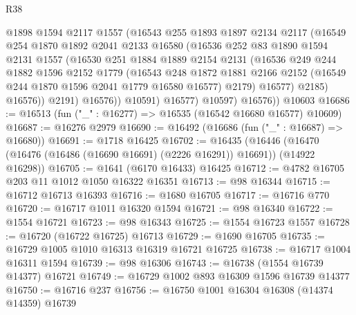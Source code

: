 \begin{lexlean}{R38}
\begin{coremodule}
                  @1898
                  @1594
                  @2117
                  @1557
                  (@16543
                    @255
                    @1893
                    @1897
                    @2134
                    @2117
                    (@16549
                      @254
                      @1870
                      @1892
                      @2041
                      @2133
                      @16580
                      (@16536
                        @252
                        @83
                        @1890
                        @1594
                        @2131
                        @1557
                        (@16530
                          @251
                          @1884
                          @1889
                          @2154
                          @2131
                          (@16536
                            @249
                            @244
                            @1882
                            @1596
                            @2152
                            @1779
                            (@16543
                              @248
                              @1872
                              @1881
                              @2166
                              @2152
                              (@16549 @244 @1870 @1596 @2041 @1779 @16580 @16577)
                              @2179)
                            @16577)
                          @2185)
                        @16576))
                    @2191)
                  @16576))
              @10591)
            @16577)
          @10597)
        @16576))
    @10603
@16686 := @16513 (fun ("_" : @16277) => @16535 (@16542 @16680 @16577) @10609)
@16687 := @16276 @2979
@16690 := @16492 (@16686 (fun ("_" : @16687) => @16680))
@16691 := @1718 @16425
@16702 := @16435
    (@16446 (@16470 (@16476 (@16486 (@16690 @16691) (@2226 @16291)) @16691)) (@14922 @16298))
@16705 := @1641 (@6170 @16433) @16425
@16712 := @4782 @16705 @203 @11 @1012 @1050 @16322 @16351
@16713 := @98 @16344
@16715 := @16712 @16713 @16393
@16716 := @1680 @16705
@16717 := @16716 @770
@16720 := @16717 @1011 @16320 @1594
@16721 := @98 @16340
@16722 := @1554 @16721
@16723 := @98 @16343
@16725 := @1554 @16723 @1557
@16728 := @16720 (@16722 @16725) @16713
@16729 := @1690 @16705
@16735 := @16729 @1005 @1010 @16313 @16319 @16721 @16725
@16738 := @16717 @1004 @16311 @1594
@16739 := @98 @16306
@16743 := @16738 (@1554 @16739 @14377) @16721
@16749 := @16729 @1002 @893 @16309 @1596 @16739 @14377
@16750 := @16716 @237
@16756 := @16750 @1001 @16304 @16308 (@14374 @14359) @16739

\end{coremodule}
\end{lexlean}
